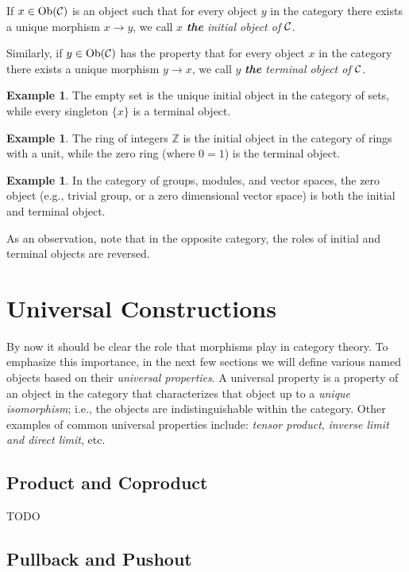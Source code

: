 \documentclass[11pt]{article}
\theoremstyle{definition}
\newtheorem{example}[theorem]{Example}
\begin{document}
If $x\in\mathrm{Ob}(\mathcal{C})$ is an object such that for every object $y$ in the category there exists a unique morphism $x\to y$, we call
$x$ \textit{\textbf{the} initial object of $\mathcal{C}$}.

Similarly, if $y\in\mathrm{Ob}(\mathcal{C})$ has the property that for every object $x$ in the category there exists a unique morphism $y\to x$,
we call $y$ \textit{\textbf{the} terminal object of $\mathcal{C}$}.

\begin{example}
  The empty set is the unique initial object in the category of sets, while every singleton $\{x\}$ is a terminal object.
\end{example}

\begin{example}
  The ring of integers $\mathbb Z$ is the initial object in the category of rings with a unit, while the zero ring (where $0=1$) is the terminal object.
\end{example}

\begin{example}
  In the category of groups, modules, and vector spaces, the zero object (e.g., trivial group, or a zero dimensional vector space) is both the initial and terminal object.
\end{example}

As an observation, note that in the opposite category, the roles of initial and terminal objects are reversed.

\section{Universal Constructions}

By now it should be clear the role that morphisms play in category theory. To emphasize this importance, in the next few sections we will define various named objects based on their \textit{universal properties}. A universal property is a property of an object in the category that characterizes that object up to a \textit{unique isomorphism}; i.e., the objects are indistinguishable within the category. Other examples of common universal properties include:
\textit{tensor product}, \textit{inverse limit and direct limit}, etc.

\subsection{Product and Coproduct}


TODO

\break
\subsection{Pullback and Pushout}
\end{document}
